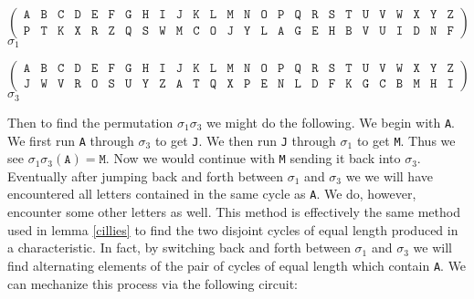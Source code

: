 \begin{center}
	\[
		\left(
		\begin{array}{llllllllllllllllllllllllll}
				\texttt{A} & \texttt{B} & \texttt{C} & \texttt{D} &
				\texttt{E} & \texttt{F} & \texttt{G} & \texttt{H} &
				\texttt{I} & \texttt{J} & \texttt{K} & \texttt{L} &
				\texttt{M} & \texttt{N} & \texttt{O} & \texttt{P} &
				\texttt{Q} & \texttt{R} & \texttt{S} & \texttt{T} &
				\texttt{U} & \texttt{V} & \texttt{W} & \texttt{X} &
				\texttt{Y} & \texttt{Z}                             \\
				\texttt{P} & \texttt{T} & \texttt{K} & \texttt{X} &
				\texttt{R} & \texttt{Z} & \texttt{Q} & \texttt{S} &
				\texttt{W} & \texttt{M} & \texttt{C} & \texttt{O} &
				\texttt{J} & \texttt{Y} & \texttt{L} & \texttt{A} &
				\texttt{G} & \texttt{E} & \texttt{H} & \texttt{B} &
				\texttt{V} & \texttt{U} & \texttt{I} & \texttt{D} &
				\texttt{N} & \texttt{F}
			\end{array}
		\right)
	\]
	$\sigma_1$
\end{center}
\begin{center}
	\[
		\left(
		\begin{array}{llllllllllllllllllllllllll}
				\texttt{A} & \texttt{B} & \texttt{C} & \texttt{D} &
				\texttt{E} & \texttt{F} & \texttt{G} & \texttt{H} &
				\texttt{I} & \texttt{J} & \texttt{K} & \texttt{L} &
				\texttt{M} & \texttt{N} & \texttt{O} & \texttt{P} &
				\texttt{Q} & \texttt{R} & \texttt{S} & \texttt{T} &
				\texttt{U} & \texttt{V} & \texttt{W} & \texttt{X} &
				\texttt{Y} & \texttt{Z}                             \\
				\texttt{J} & \texttt{W} & \texttt{V} & \texttt{R} &
				\texttt{O} & \texttt{S} & \texttt{U} & \texttt{Y} &
				\texttt{Z} & \texttt{A} & \texttt{T} & \texttt{Q} &
				\texttt{X} & \texttt{P} & \texttt{E} & \texttt{N} &
				\texttt{L} & \texttt{D} & \texttt{F} & \texttt{K} &
				\texttt{G} & \texttt{C} & \texttt{B} & \texttt{M} &
				\texttt{H} & \texttt{I}
			\end{array}
		\right)
	\]
	$\sigma_3$
\end{center}
Then to find the permutation $\sigma_1\sigma_3$ we might do the following. We begin with \texttt{A}. We first run \texttt{A} through $\sigma_3$ to get \texttt{J}. We then run \texttt{J} through $\sigma_1$ to get \texttt{M}. Thus we see $\sigma_1\sigma_3(\texttt{A}) = \texttt{M}$. Now we would continue with \texttt{M} sending it back into $\sigma_3$. Eventually after jumping back and forth between $\sigma_1$ and $\sigma_3$ we we will have encountered all letters contained in the same cycle as \texttt{A}. We do, however, encounter some other letters as well. This method is effectively the same method used in lemma \ref{cillies} to find the two disjoint cycles of equal length produced in a characteristic. In fact, by switching back and forth between $\sigma_1$ and $\sigma_3$ we will find alternating elements of the pair of cycles of equal length which contain \texttt{A}. We can mechanize this process via the following circuit:
